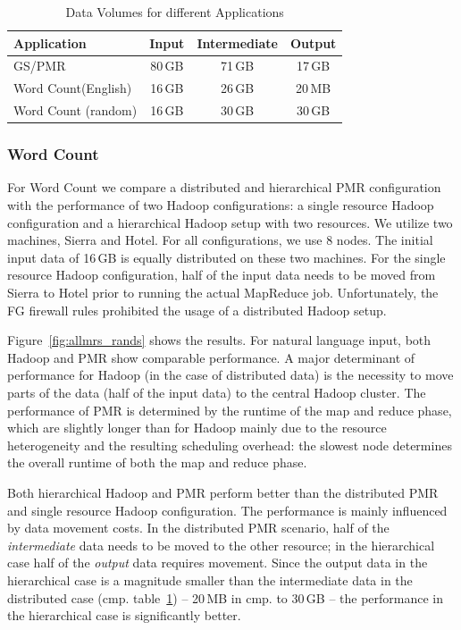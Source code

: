 \documentclass{sig-alternate}
\newcommand{\upp}{\vspace*{-0.5em}}
\begin{document}
\begin{table}[ht]
	\centering
\begin{tabular}{|p{2cm}|c|c|c|}
\hline
\textbf{Application} &\textbf{Input} &\textbf{Intermediate} &\textbf{Output}\\
\hline
GS/PMR 		&80\,GB &71\,GB		 &17\,GB\\
\hline
Word Count\linebreak[4] (English) &16\,GB&26\,GB&20\,MB\\
\hline
Word Count (random) &16\,GB&30\,GB&30\,GB\\
\hline
\end{tabular}
\caption{Data Volumes for different Applications\upp\upp}
\label{tab:data-volumes}
\end{table}

\upp\upp
\subsubsection*{Word Count}

For Word Count we compare a distributed and hierarchical PMR
configuration with the performance of two Hadoop configurations: a
single resource Hadoop configuration and a hierarchical Hadoop setup
with two resources. We utilize two machines, Sierra and Hotel. For all
configurations, we use 8 nodes. The initial input data of 16\,GB is
equally distributed on these two machines. For the single resource
Hadoop configuration, half of the input data needs to be moved from
Sierra to Hotel prior to running the actual MapReduce
job. Unfortunately, the FG firewall rules prohibited the usage
of a distributed Hadoop setup.

Figure~\ref{fig:allmrs_rands} shows the results. For natural language
input, both Hadoop and PMR show comparable performance. A major
determinant of performance for Hadoop (in the case of distributed
data) is the necessity to move parts of the data (half of the input
data) to the central Hadoop cluster. The performance of PMR is
determined by the runtime of the map and reduce phase, which are
slightly longer than for Hadoop mainly due to the resource
heterogeneity and the resulting scheduling overhead: the slowest node
determines the overall runtime of both the map and reduce phase.

Both hierarchical Hadoop and PMR perform better than
the distributed PMR and single resource Hadoop configuration. The
performance is mainly influenced by data movement costs. In the
distributed PMR scenario, half of the {\it intermediate} data needs to
be moved to the other resource; in the hierarchical case half of the
{\it output} data requires movement. Since the output data in the
hierarchical case is a magnitude smaller than the intermediate data in
the distributed case (cmp. table~\ref{tab:data-volumes}) -- 20\,MB in
cmp. to 30\,GB -- the performance in the hierarchical case is
significantly better.
\end{document}
